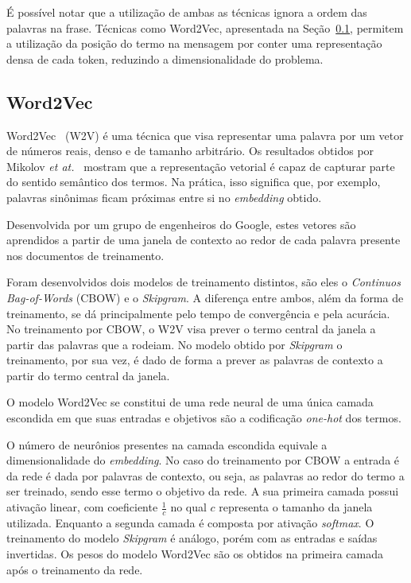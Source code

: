 É possível notar que a utilização de ambas as técnicas ignora a ordem das palavras na frase.
Técnicas como Word2Vec, apresentada na Seção~\ref{sec:w2v}, permitem a utilização da posição do termo na mensagem por conter
uma representação densa de cada token, reduzindo a dimensionalidade do problema.

\subsection{Word2Vec} \label{sec:w2v}

Word2Vec~\cite{mikolov13} (W2V) é uma técnica que visa representar uma palavra por um vetor de números reais, denso e de
tamanho arbitrário.
Os resultados obtidos por Mikolov \textit{et at.}~\cite{mikolov13} mostram que a representação vetorial é capaz de
capturar parte do sentido semântico dos termos.
Na prática, isso significa que, por exemplo, palavras sinônimas ficam próximas entre si no \textit{embedding} obtido.

Desenvolvida por um grupo de engenheiros do Google, estes vetores são aprendidos a partir de uma janela de contexto
ao redor de cada palavra presente nos documentos de treinamento.

Foram desenvolvidos dois modelos de treinamento distintos, são eles o \textit{Continuos Bag-of-Words} (CBOW) e o
\textit{Skipgram}.
A diferença entre ambos, além da forma de treinamento, se dá principalmente pelo tempo de convergência e pela acurácia.
No treinamento por CBOW, o W2V visa prever o termo central da janela a partir das palavras que a rodeiam.
No modelo obtido por \textit{Skipgram} o treinamento, por sua vez, é dado de forma a prever as palavras de contexto a
partir do termo central da janela.

O modelo Word2Vec se constitui de uma rede neural de uma única camada escondida em que suas entradas e objetivos são a
codificação \textit{one-hot} dos termos.

O número de neurônios presentes na camada escondida equivale a dimensionalidade do \textit{embedding}.
No caso do treinamento por CBOW a entrada é da rede é dada por palavras de contexto, ou seja, as palavras ao redor do
termo a ser treinado, sendo esse termo o objetivo da rede.
A sua primeira camada possui ativação linear, com coeficiente $\frac{1}{c}$ no qual $c$ representa o tamanho da janela
utilizada.
Enquanto a segunda camada é composta por ativação \textit{softmax}.
O treinamento do modelo \textit{Skipgram} é análogo, porém com as entradas e saídas invertidas.
Os pesos do modelo Word2Vec são os obtidos na primeira camada após o treinamento da rede.


